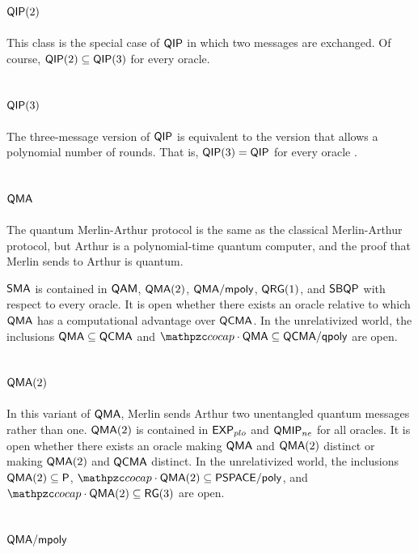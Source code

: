 \subsection{$\mathsf{QIP}(2)$}

This class is the special case of $\mathsf{QIP}$ in which two messages are 
exchanged. Of course, $\mathsf{QIP}(2)\subseteq\mathsf{QIP}(3)$ for every oracle.

\subsection{$\mathsf{QIP}(3)$}

The three-message version of $\mathsf{QIP}$ is equivalent to the version that 
allows a polynomial number of rounds. That is, $\mathsf{QIP}(3)=\mathsf{QIP}$ for 
every oracle \cite{marriott2005quantum}.

\subsection{$\mathsf{QMA}$}

The quantum Merlin-Arthur protocol is the same as the classical Merlin-Arthur 
protocol, but Arthur is a polynomial-time quantum computer, and the proof that 
Merlin sends to Arthur is quantum.

$\mathsf{SMA}$ is contained in $\mathsf{QAM}$, $\mathsf{QMA}(2)$, 
$\mathsf{QMA}/\mathsf{mpoly}$, $\mathsf{QRG}(1)$, and $\mathsf{SBQP}$ with respect to every 
oracle. It is open whether there exists an oracle relative to which $\mathsf{QMA}$ 
has a computational advantage over $\mathsf{QCMA}$. In the unrelativized world, the
inclusions $\mathsf{QMA}\subseteq\mathsf{QCMA}$ and 
$\cocap\cdot\msf{QMA}\subseteq\msf{QCMA}/\msf{qpoly}$ are open.

\subsection{$\mathsf{QMA}(2)$}

In this variant of $\mathsf{QMA}$, Merlin sends Arthur two unentangled quantum 
messages rather than one. $\mathsf{QMA}(2)$ is contained in $\mathsf{EXP}_{plo}$ and 
$\mathsf{QMIP}_{ne}$ for all oracles. It is open whether there exists an oracle 
making $\mathsf{QMA}$ and $\mathsf{QMA}(2)$ distinct or making $\mathsf{QMA}(2)$ and 
$\mathsf{QCMA}$ distinct. In the unrelativized world, the inclusions 
$\mathsf{QMA}(2)\subseteq\mathsf{P}$, 
$\cocap\cdot\msf{QMA}(2)\subseteq\msf{PSPACE}/\poly$, and 
$\cocap\cdot\msf{QMA}(2)\subseteq\msf{RG}(3)$ are open.

\subsection{$\mathsf{QMA}/\mathsf{mpoly}$}

